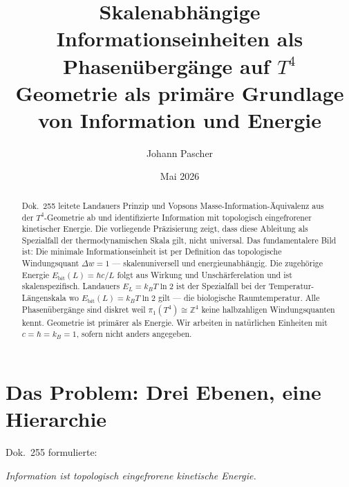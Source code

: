 
\title{Skalenabhängige Informationseinheiten als\\
Phasenübergänge auf \(T^4\)\\[0.4em]
\large Geometrie als primäre Grundlage von Information und Energie}
\author{Johann Pascher}
\date{Mai 2026}
\maketitle

\begin{abstract}
Dok.~255 leitete Landauers Prinzip und Vopsons Masse-Information-Äquivalenz
aus der \(T^4\)-Geometrie ab und identifizierte Information mit
topologisch eingefrorener kinetischer Energie.
Die vorliegende Präzisierung zeigt, dass diese Ableitung als
Spezialfall der thermodynamischen Skala gilt, nicht universal.
Das fundamentalere Bild ist: Die minimale Informationseinheit ist
per Definition das topologische Windungsquant \(\Delta w = 1\) —
skalenuniversell und energieunabhängig.
Die zugehörige Energie \(E_\text{bit}(L) = \hbar c / L\)
folgt aus Wirkung und Unschärferelation und ist skalenspezifisch.
Landauers \(E_L = k_B T \ln 2\) ist der Spezialfall bei der
Temperatur-Längenskala wo \(E_\text{bit}(L) = k_BT\ln2\) gilt —
die biologische Raumtemperatur.
Alle Phasenübergänge sind diskret weil \(\pi_1(T^4) \cong \mathbb{Z}^4\)
keine halbzahligen Windungsquanten kennt.
Geometrie ist primärer als Energie.
Wir arbeiten in natürlichen Einheiten mit \(c = \hbar = k_B = 1\),
sofern nicht anders angegeben.
\end{abstract}

\tableofcontents
\newpage

\section{Das Problem: Drei Ebenen, eine Hierarchie}

Dok.~255 formulierte:
\begin{center}
\textit{Information ist topologisch eingefrorene kinetische Energie.}
\end{center}

